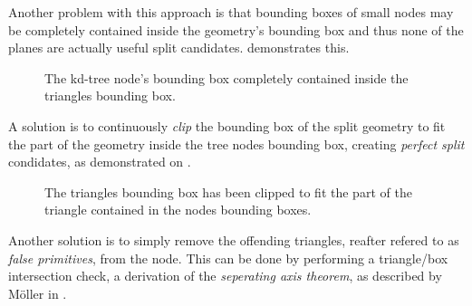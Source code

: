 Another problem with this approach is that bounding boxes of small
nodes may be completely contained inside the geometry's bounding box
and thus none of the planes are actually useful split
candidates.  demonstrates this.

\begin{figure}
  \centering
    
  \vspace{3mm}
  \parbox{5cm}{\caption[A tree node's bounding box contained in a
      triangle's bounding box.]{The kd-tree node's bounding box
      completely contained inside the triangles bounding
      box.}\label{fig:aabbContained}}
\end{figure}

A solution is to continuously \textit{clip} the bounding box of the
split geometry to fit the part of the geometry inside the tree nodes
bounding box, creating \textit{perfect split} condidates, as
demonstrated on .

\begin{figure}
  \centering

  \vspace{3mm}
  \parbox{5cm}{ \caption[Triangle clipping.]{The triangles bounding
      box has been clipped to fit the part of the triangle contained
      in the nodes bounding boxes.}\label{fig:aabbClipped}}
\end{figure}

Another solution is to simply remove the offending triangles, reafter
refered to as \textit{false primitives}, from the node. This can be
done by performing a triangle/box intersection check, a derivation of
the \textit{seperating axis theorem}, as described by Möller in
.


